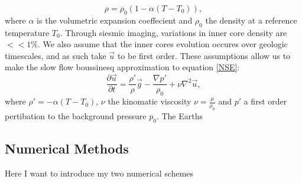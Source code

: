 \documentclass{article}
\begin{document}
\begin{equation}
	\rho = \rho_0 (1- \alpha(T - T_0)),
	\label{equation of state}
\end{equation}
where $\alpha$ is the volumetric expansion coeffecient and $\rho_0$ the density at a reference temperature $T_0$.
Through siesmic imaging, variations in inner core density are $<< 1 \%$. We also assume that the inner cores evolution occures over geologic timescales, and as such take $\vec{u}$ to be first order. These assumptions allow us to make the slow flow boussinesq approximation to equation \ref{NSE}:
\begin{equation}
	\frac{\partial \vec{u}}{\partial t} = \frac{\rho'}{\rho} \vec{g} -   \frac{\nabla p'}{\rho_0} + \nu \nabla^2 \vec{u},
	\label{NSE slow + boussinesq}
\end{equation}
where $\rho'=-\alpha(T - T_0)$, $\nu$ the kinomatic viscosity $\nu = \frac{\mu}{\rho_0}$ and $p'$ a first order pertibation to the background pressure $p_0$.
\newline
The Earths











\subsection*{Numerical Methods}
Here I want to introduce my two numerical schemes
\end{document}
